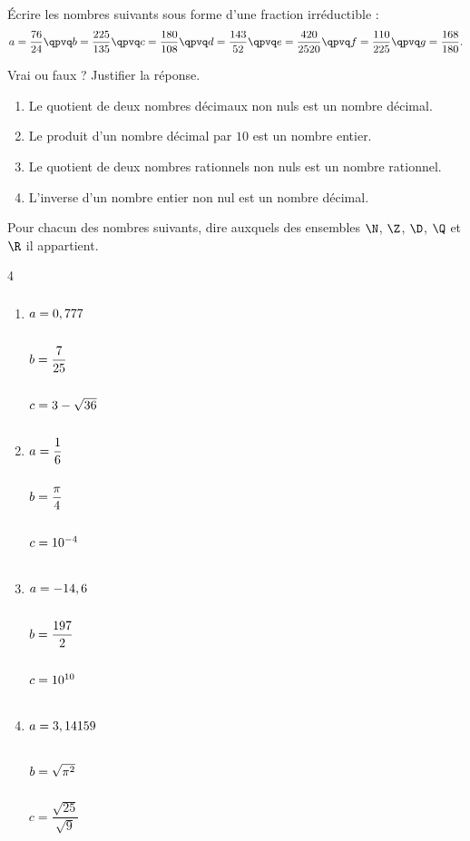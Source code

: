 \exo

Écrire les nombres suivants sous forme d'une fraction irréductible :
\[
a=\frac{76}{24}
\qpvq b=\frac{225}{135}
\qpvq c=\frac{180}{108}
\qpvq d=\frac{143}{52}
\qpvq e=\frac{420}{2520}
\qpvq f=\frac{110}{225}
\qpvq g=\frac{168}{180}.
\]

\exo

Vrai ou faux ? Justifier la réponse.
\begin{enumerate}
\item Le quotient de deux nombres décimaux non nuls est un nombre décimal.
\item Le produit d'un nombre décimal par $10$ est un nombre entier.
\item Le quotient de deux nombres rationnels non nuls est un nombre rationnel.
\item L'inverse d'un nombre entier non nul est un nombre décimal.
\end{enumerate}

\exo

Pour chacun des nombres suivants, dire auxquels des ensembles $\N$, $\Z$, $\D$, $\Q$ et $\R$ il appartient.

\vspace{-6pt}
\setlength{\columnsep}{1cm}
\setlength{\columnseprule}{0.1pt}
\begin{multicols}{4}
\begin{enumerate}
\item $a=0,777\vphantom{\dfrac{\sqrt{25}}{\sqrt{9}}}$

\medskip
$b=\dfrac{7}{25}\vphantom{\dfrac{\sqrt{25}}{\sqrt{9}}}$

\medskip
$c=3-\sqrt{36}\vphantom{\dfrac{\sqrt{25}}{\sqrt{9}}}$
\item $a=\dfrac{1}{6}\vphantom{\dfrac{\sqrt{25}}{\sqrt{9}}}$

\medskip 
$b=\dfrac{\pi}{4}\vphantom{\dfrac{\sqrt{25}}{\sqrt{9}}}$

\medskip
$c=10^{-4}\vphantom{\dfrac{\sqrt{25}}{\sqrt{9}}}$
\item $a=-14,6\vphantom{\dfrac{\sqrt{25}}{\sqrt{9}}}$

\medskip 
$b=\dfrac{197}{2}\vphantom{\dfrac{\sqrt{25}}{\sqrt{9}}}$

\medskip
$c=10^{10}\vphantom{\dfrac{\sqrt{25}}{\sqrt{9}}}$
\item $a=3,14159\vphantom{\dfrac{\sqrt{25}}{\sqrt{9}}}$

\medskip
$b=\sqrt{\pi^2}\vphantom{\dfrac{\sqrt{25}}{\sqrt{9}}}$

\medskip
$c=\dfrac{\sqrt{25}}{\sqrt{9}}$
\end{enumerate}
\end{multicols}
\vspace{-12pt}

